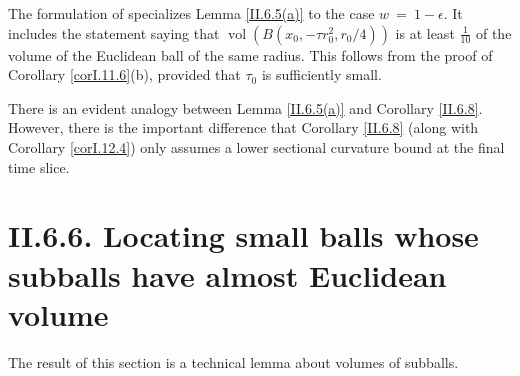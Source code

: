 \documentclass[12pt]{amsart}
\newcommand{\vol}{\operatorname{vol}}
\numberwithin{equation}{section}
\theoremstyle{plain}
\theoremstyle{definition}
\theoremstyle{remark}
\begin{document}
The formulation of \cite[Lemma II.6.5]{Perelman2} specializes Lemma
\ref{II.6.5(a)} to the case
$w \: = \: 1 - \epsilon$. It includes the statement
\cite[Lemma II.6.5(b)]{Perelman2} saying that $\vol(B(x_0, -\tau
r_0^2, r_0/4))$ is at
least $\frac{1}{10}$ of the volume of the Euclidean ball of the same
radius.  This follows from the proof of Corollary \ref{corI.11.6}(b), provided
that $\tau_0$ is sufficiently small.

There is an evident analogy between Lemma \ref{II.6.5(a)} and
Corollary \ref{II.6.8}. However, there is the important difference that
Corollary \ref{II.6.8} (along with Corollary \ref{corI.12.4}) only
assumes a lower sectional curvature bound at the final time slice.

\section{II.6.6. Locating small balls whose subballs have almost
Euclidean volume}

The result of this section is a technical lemma about volumes
of subballs.
\end{document}
